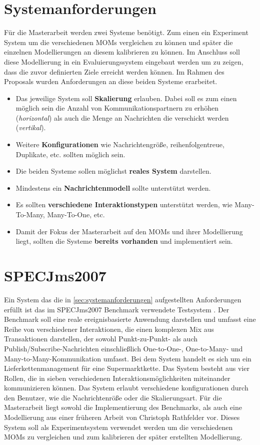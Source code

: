 \section{Systemanforderungen}
\label{sec:systemanforderungen}
Für die Masterarbeit werden zwei Systeme benötigt. Zum einen ein Experiment System um die verschiedenen MOMs vergleichen zu können und später die einzelnen Modellierungen an diesem kalibrieren zu können. Im Anschluss soll diese Modellierung in ein Evaluierungssystem eingebaut werden um zu zeigen, dass die zuvor definierten Ziele erreicht werden können. Im Rahmen des Proposals wurden Anforderungen an diese beiden Systeme erarbeitet.
\begin{itemize}
\item Das jeweilige System soll \textbf{Skalierung} erlauben. Dabei soll es zum einen möglich sein die Anzahl von Kommunikationspartnern zu erhöhen (\textit{horizontal}) als auch die Menge an Nachrichten die verschickt werden (\textit{vertikal}).
\item Weitere \textbf{Konfigurationen} wie Nachrichtengröße, reihenfolgentreue, Duplikate, etc. sollten möglich sein.
\item Die beiden Systeme sollen möglichst \textbf{reales System} darstellen.
\item Mindestens ein \textbf{Nachrichtenmodell} sollte unterstützt werden.
\item Es sollten \textbf{verschiedene Interaktionstypen} unterstützt werden, wie Many-To-Many, Many-To-One, etc.
\item Damit der Fokus der Masterarbeit auf den MOMs und ihrer Modellierung liegt, sollten die Systeme \textbf{bereits vorhanden} und implementiert sein.
\end{itemize}

\section{SPECJms2007}
Ein System das die in \autoref{sec:systemanforderungen} aufgestellten Anforderungen erfüllt ist das im SPECJms2007 Benchmark verwendete Testsystem \cite{Sachs2013}. Der Benchmark soll eine reale ereignisbasierte Anwendung darstellen und umfasst eine Reihe von verschiedener Interaktionen, die einen komplexen Mix aus Transaktionen darstellen, der sowohl Punkt-zu-Punkt- als auch Publish/Subscribe-Nachrichten einschließlich One-to-One-, One-to-Many- und Many-to-Many-Kommunikation umfasst. Bei dem System handelt es sich um ein Lieferkettenmanagement für eine Supermarktkette. Das System besteht aus vier Rollen, die in sieben verschiedenen Interaktionsmöglichkeiten miteinander kommunizieren können. Das System erlaubt verschiedene konfigurationen durch den Benutzer, wie die Nachrichtenröße oder die Skalierungsart. Für die Masterarbeit liegt sowohl die Implementierung des Benchmarks, als auch eine Modellierung aus einer früheren Arbeit von Christoph Rathfelder \cite{Rathfelder2013} vor. Dieses System soll als Experimentsystem verwendet werden um die verschiedenen MOMs zu vergleichen und zum kalibrieren der später erstellten Modellierung. 
